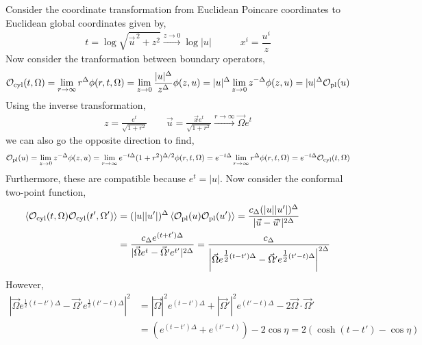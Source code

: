 \documentclass[12pt]{article}
\begin{document}
\subsection{}

Consider the coordinate transformation from Euclidean Poincare coordinates to Euclidean global coordinates given by,
\[ t = \log{\sqrt{\vec{u}^{\, 2} + z^2}} \xrightarrow{z \to 0} \log{|u|} \quad \quad \quad x^i = \frac{u^i}{z} \]
Now consider the tranformation between boundary operators,
\begin{align*}
\mathcal{O}_{\text{cyl}}(t, \Omega) = \lim_{r \to \infty} r^{\Delta} \phi(r, t, \Omega) = \lim_{z \to 0} \frac{|u|^\Delta}{z^\Delta} \phi(z, u) = |u|^{\Delta} \lim_{z \to 0} z^{-\Delta} \phi(z, u) = |u|^{\Delta} \mathcal{O}_{\text{pl}}(u)
\end{align*} 
Using the inverse transformation,
\begin{align*}
z = \frac{e^{t}}{\sqrt{1 + r^2}} \quad \quad \vec{u} = \frac{\vec{x} e^t}{\sqrt{1 + r^2}} \xrightarrow{r \to \infty} \vec{\Omega} e^t 
\end{align*}
we can also go the opposite direction to find,
\begin{align*}
\mathcal{O}_{\text{pl}}(u) = \lim_{z \to 0} z^{-\Delta} \phi(z, u) = \lim_{r \to \infty} e^{-t \Delta} (1 + r^2)^{\Delta / 2} \phi(r, t, \Omega) = e^{-t \Delta} \lim_{r \to \infty}  r^{\Delta} \phi(r, t, \Omega) = e^{- t \Delta} \mathcal{O}_{\text{cyl}}(t, \Omega)
\end{align*}
Furthermore, these are compatible because $e^t = |u|$. Now consider the conformal two-point function,
\begin{align*}
\left< \mathcal{O}_{\text{cyl}}(t, \Omega) \mathcal{O}_{\text{cyl}}(t', \Omega') \right> & = (|u| |u'|)^{\Delta} \left< \mathcal{O}_{\text{pl}}(u) \mathcal{O}_{\text{pl}}(u') \right> = \frac{c_\Delta (|u| |u'|)^{\Delta}}{|\vec{u} - \vec{u}'|^{2\Delta}}
\\
& = \frac{c_\Delta e^{(t + t') \Delta}}{|\vec{\Omega} e^t - \vec{\Omega}' e^{t'}|^{2\Delta}} = \frac{c_{\Delta}}{\left|\vec{\Omega} e^{\tfrac{1}{2}(t - t') \Delta} - \vec{\Omega}' e^{\tfrac{1}{2}(t' - t) \Delta} \right|^{2 \Delta}}
\end{align*}
However,
\begin{align*}
\left|\vec{\Omega} e^{\tfrac{1}{2}(t - t') \Delta} - \vec{\Omega}' e^{\tfrac{1}{2}(t' - t) \Delta} \right|^2 & = |\vec{\Omega}|^2 e^{(t - t')\Delta} + |\vec{\Omega}'|^2 e^{(t' - t)\Delta} - 2 \vec{\Omega} \cdot \vec{\Omega}'
\\
& = (e^{(t - t') \Delta} + e^{(t' - t)}) - 2 \cos{\eta} = 2 \left( \cosh{(t - t')} - \cos{\eta} \right)
\end{align*}
\end{document}
